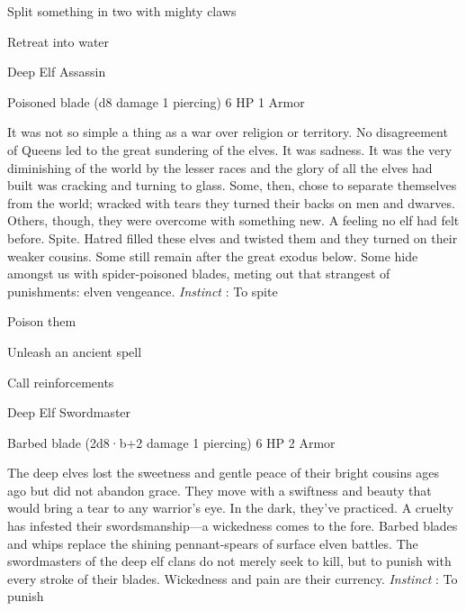 \startitemize[1,packed]

\item Split something in two with mighty claws

 
\item Retreat into water


\stopitemize
 
\startMonsterName
Deep Elf Assassin	 
\stopMonsterName
 

Poisoned blade (d8 damage 1 piercing)	6 HP	1 Armor

 


 
\startMonsterDescription
It was not so simple a thing as a war over religion or territory. No disagreement of Queens led to the great sundering of the elves. It was sadness. It was the very diminishing of the world by the lesser races and the glory of all the elves had built was cracking and turning to glass. Some, then, chose to separate themselves from the world; wracked with tears they turned their backs on men and dwarves. Others, though, they were overcome with something new. A feeling no elf had felt before. Spite. Hatred filled these elves and twisted them and they turned on their weaker cousins. Some still remain after the great exodus below. Some hide amongst us with spider-poisoned blades, meting out that strangest of punishments: elven vengeance. {\em Instinct} : To spite
\stopMonsterDescription
 
\startitemize[1,packed]

\item Poison them

 
\item Unleash an ancient spell

 
\item Call reinforcements


\stopitemize
 
\startMonsterName
Deep Elf Swordmaster	 
\stopMonsterName
 

Barbed blade (2d8·b+2 damage 1 piercing)	6 HP	2 Armor

 


 
\startMonsterDescription
The deep elves lost the sweetness and gentle peace of their bright cousins ages ago but did not abandon grace. They move with a swiftness and beauty that would bring a tear to any warrior’s eye. In the dark, they’ve practiced. A cruelty has infested their swordsmanship—a wickedness comes to the fore. Barbed blades and whips replace the shining pennant-spears of surface elven battles. The swordmasters of the deep elf clans do not merely seek to kill, but to punish with every stroke of their blades. Wickedness and pain are their currency. {\em Instinct} : To punish
\stopMonsterDescription
 
